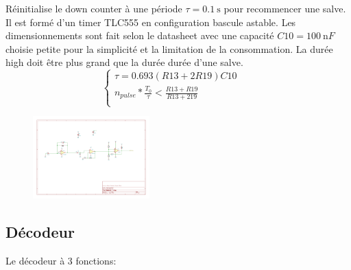 \documentclass[french]{layout/Report}
\begin{document}
\begin{description}[leftmargin=!,labelwidth=3cm, labelindent=\parindent]
	\item[Burst timer] Réinitialise le down counter à une période $\tau = \SI{0.1}{\second}$ pour recommencer une salve. Il est formé d'un timer TLC555 en configuration bascule astable. Les dimensionnements sont fait selon le datasheet \cite{TLC555} avec une capacité $\mathit{C10} = \SI{100}{\nano F}$ choisie petite pour la simplicité et la limitation de la consommation. La durée high doit être plus grand que la durée durée d'une salve.
		\begin{equation*}
			\begin{cases}
				\tau = 0.693(\mathit{R13}+2\mathit{R19})\mathit{C10} \\
				n_{pulse}*\frac{T_0}{\tau} < \frac{\mathit{R13}+\mathit{R19}}{\mathit{R13}+2\mathit{19}} \\
			\end{cases}
		\quad\
		\
	\end{equation*}

		\begin{figure}[H]
			\centering
			\includegraphics[width=0.4\textwidth]{fig/schmitt_trigger.pdf}
		\end{figure}
\end{description}

\subsection{Décodeur}
Le décodeur à 3 fonctions:
\end{document}
